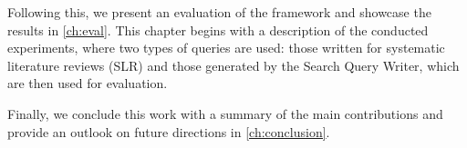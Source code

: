 Following this, we present an evaluation of the framework and showcase the results in \autoref{ch:eval}. This chapter begins with a description of the conducted experiments, where two types of queries are used: those written for systematic literature reviews (SLR) and those generated by the Search Query Writer, which are then used for evaluation.

Finally, we conclude this work with a summary of the main contributions and provide an outlook on future directions in \autoref{ch:conclusion}.

